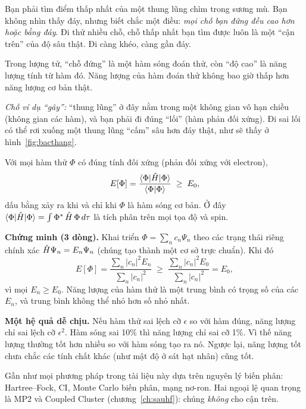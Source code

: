 \begin{eli5}
Bạn phải tìm điểm thấp nhất của một thung lũng chìm trong sương mù. Bạn không nhìn thấy đáy, nhưng biết chắc một điều: \emph{mọi chỗ bạn đứng đều cao hơn hoặc bằng đáy}. Đi thử nhiều chỗ, chỗ thấp nhất bạn tìm được luôn là một ``cận trên'' của độ sâu thật. Đi càng khéo, càng gần đáy.

Trong lượng tử, ``chỗ đứng'' là một hàm sóng đoán thử, còn ``độ cao'' là năng lượng tính từ hàm đó. Năng lượng của hàm đoán thử không bao giờ thấp hơn năng lượng cơ bản thật.

\emph{Chỗ ví dụ ``gãy'':} ``thung lũng'' ở đây nằm trong một không gian vô hạn chiều (không gian các hàm), và bạn phải đi đúng ``lối'' (hàm phản đối xứng). Đi sai lối có thể rơi xuống một thung lũng ``cấm'' sâu hơn đáy thật, như sẽ thấy ở hình~\ref{fig:bacthang}.
\end{eli5}

\begin{congthuc}
Với mọi hàm thử $\Phi$ có đúng tính đối xứng (phản đối xứng với electron),
\[
E[\Phi]=\frac{\langle\Phi|\hat H|\Phi\rangle}{\langle\Phi|\Phi\rangle}\;\ge\;E_0 ,
\]
dấu bằng xảy ra khi và chỉ khi $\Phi$ là hàm sóng cơ bản. Ở đây $\langle\Phi|\hat H|\Phi\rangle=\int\Phi^*\,\hat H\,\Phi\,d\tau$ là tích phân trên mọi tọa độ và spin.

\textbf{Chứng minh (3 dòng).} Khai triển $\Phi=\sum_n c_n\Psi_n$ theo các trạng thái riêng chính xác $\hat H\Psi_n=E_n\Psi_n$ (chúng tạo thành một cơ sở trực chuẩn). Khi đó
\[
E[\Phi]=\frac{\sum_n|c_n|^2E_n}{\sum_n|c_n|^2}\;\ge\;\frac{\sum_n|c_n|^2E_0}{\sum_n|c_n|^2}=E_0 ,
\]
vì mọi $E_n\ge E_0$. Năng lượng của hàm thử là một trung bình có trọng số của các $E_n$, và trung bình không thể nhỏ hơn số nhỏ nhất.

\textbf{Một hệ quả dễ chịu.} Nếu hàm thử sai lệch cỡ $\epsilon$ so với hàm đúng, năng lượng chỉ sai lệch cỡ $\epsilon^2$. Hàm sóng sai 10\% thì năng lượng chỉ sai cỡ 1\%. Vì thế năng lượng thường tốt hơn nhiều so với hàm sóng tạo ra nó. Ngược lại, năng lượng tốt chưa chắc các tính chất khác (như mật độ ở sát hạt nhân) cũng tốt.
\end{congthuc}

Gần như mọi phương pháp trong tài liệu này dựa trên nguyên lý biến phân: Hartree--Fock, CI, Monte Carlo biến phân, mạng nơ-ron. Hai ngoại lệ quan trọng là MP2 và Coupled Cluster (chương~\ref{ch:sauhf}): chúng \emph{không} cho cận trên.


